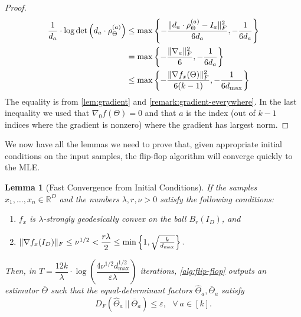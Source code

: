 \documentclass[aos]{imsart}
\newtheorem{lemma}[theorem]{Lemma}
\theoremstyle{definition}
\numberwithin{equation}{section}
\DeclarePairedDelimiter{\norm}{\lVert}{\rVert}
\newcommand{\R}{{\mathbb{R}}}
\newcommand{\otheta}{\overline{\Theta}}
\newcommand{\htheta}{\widehat{\Theta}}
\newcommand{\eps}{\varepsilon}
\def\dmax{d_{\max}}
\begin{document}
\begin{proof}
	\begin{align*}
		\frac{1}{d_a} \cdot  \log\det\left(d_a \cdot \rho_\Theta^{(a)} \right) &\leq\max\left\{ - \dfrac{\norm{d_a \cdot \rho_\Theta^{(a)} - I_a}_F^2}{6 d_a}, -\dfrac{1}{6 d_a}\right\} \\
		&= \max\left\{ - \dfrac{\norm{\nabla_a}_F^2 }{6}, -\dfrac{1}{6 d_a}\right\}\\
		&\leq \max\left\{ - \dfrac{\norm{\nabla f_x(\Theta)}_F^2}{6(k-1)}, -\dfrac{1}{6 \dmax}\right\}
	\end{align*}
The equality is from \cref{lem:gradient} and \cref{remark:gradient-everywhere}. In the last inequality we used that $\nabla_0 f(\Theta) = 0$ and that $a$ is the index (out of $k-1$ indices where the gradient is nonzero) where the gradient has largest norm.
\end{proof}

We now have all the lemmas we need to prove that, given appropriate initial conditions on the input samples, the flip-flop algorithm will converge quickly to the MLE.

\begin{lemma}[Fast Convergence from Initial Conditions]\label{lem:fast-convergence-initial-generic}
	If the samples $x_1, \ldots, x_n \in \R^D$ and the numbers $\lambda, r, \nu > 0$ satisfy the following conditions:
	\begin{enumerate}
		\item $f_x$ is $\lambda$-strongly geodesically convex on the ball $B_r(I_D)$, and
		\item $\norm{\nabla f_x (I_D)}_F \leq \nu^{1/2} < \dfrac{r \lambda}{2} \leq \min\left\{1, \sqrt{\frac{k}{\dmax}}\right\}.$

	\end{enumerate}
	Then, in $T = \dfrac{12k}{\lambda} \cdot \log\left( \dfrac{4 \nu^{1/2} \dmax^{1/2} }{\eps \lambda} \right)$ iterations, \cref{alg:flip-flop} outputs an estimator $\otheta$ such that the equal-determinant factors $\htheta_a, \otheta_a$ satisfy 
	$$ D_F(\htheta_a \ || \ \otheta_a) \leq \eps, \ \ \ \forall \ a \in [k].$$
\end{lemma}
\end{document}
